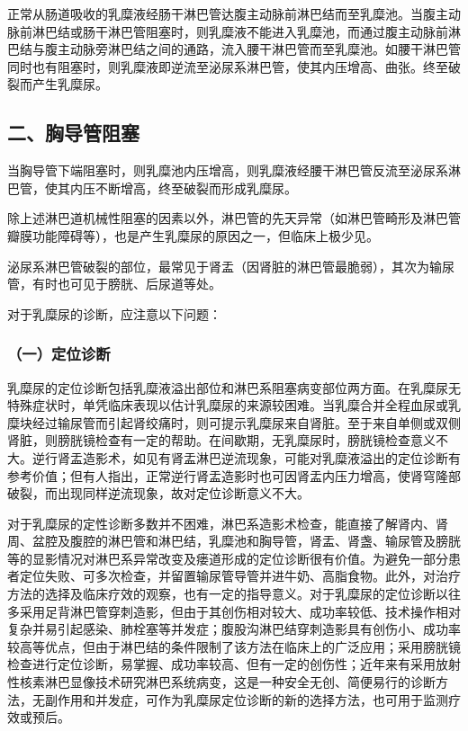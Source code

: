 正常从肠道吸收的乳糜液经肠干淋巴管达腹主动脉前淋巴结而至乳糜池。当腹主动脉前淋巴结或肠干淋巴管阻塞时，则乳糜液不能进入乳糜池，而通过腹主动脉前淋巴结与腹主动脉旁淋巴结之间的通路，流入腰干淋巴管而至乳糜池。如腰干淋巴管同时也有阻塞时，则乳糜液即逆流至泌尿系淋巴管，使其内压增高、曲张。终至破裂而产生乳糜尿。

\subsection{二、胸导管阻塞}

当胸导管下端阻塞时，则乳糜池内压增高，则乳糜液经腰干淋巴管反流至泌尿系淋巴管，使其内压不断增高，终至破裂而形成乳糜尿。

除上述淋巴道机械性阻塞的因素以外，淋巴管的先天异常（如淋巴管畸形及淋巴管瓣膜功能障碍等），也是产生乳糜尿的原因之一，但临床上极少见。

泌尿系淋巴管破裂的部位，最常见于肾盂（因肾脏的淋巴管最脆弱），其次为输尿管，有时也可见于膀胱、后尿道等处。

对于乳糜尿的诊断，应注意以下问题：

\subsubsection{（一）定位诊断}

乳糜尿的定位诊断包括乳糜液溢出部位和淋巴系阻塞病变部位两方面。在乳糜尿无特殊症状时，单凭临床表现以估计乳糜尿的来源较困难。当乳糜合并全程血尿或乳糜块经过输尿管而引起肾绞痛时，则可提示乳糜尿来自肾脏。至于来自单侧或双侧肾脏，则膀胱镜检查有一定的帮助。在间歇期，无乳糜尿时，膀胱镜检查意义不大。逆行肾盂造影术，如见有肾盂淋巴逆流现象，可能对乳糜液溢出的定位诊断有参考价值；但有人指出，正常逆行肾盂造影时也可因肾盂内压力增高，使肾穹隆部破裂，而出现同样逆流现象，故对定位诊断意义不大。

对于乳糜尿的定性诊断多数并不困难，淋巴系造影术检查，能直接了解肾内、肾周、盆腔及腹腔的淋巴管和淋巴结，乳糜池和胸导管，肾盂、肾盏、输尿管及膀胱等的显影情况对淋巴系异常改变及瘘道形成的定位诊断很有价值。为避免一部分患者定位失败、可多次检查，并留置输尿管导管并进牛奶、高脂食物。此外，对治疗方法的选择及临床疗效的观察，也有一定的指导意义。对于乳糜尿的定位诊断以往多采用足背淋巴管穿刺造影，但由于其创伤相对较大、成功率较低、技术操作相对复杂并易引起感染、肺栓塞等并发症；腹股沟淋巴结穿刺造影具有创伤小、成功率较高等优点，但由于淋巴结的条件限制了该方法在临床上的广泛应用；采用膀胱镜检查进行定位诊断，易掌握、成功率较高、但有一定的创伤性；近年来有采用放射性核素淋巴显像技术研究淋巴系统病变，这是一种安全无创、简便易行的诊断方法，无副作用和并发症，可作为乳糜尿定位诊断的新的选择方法，也可用于监测疗效或预后。

